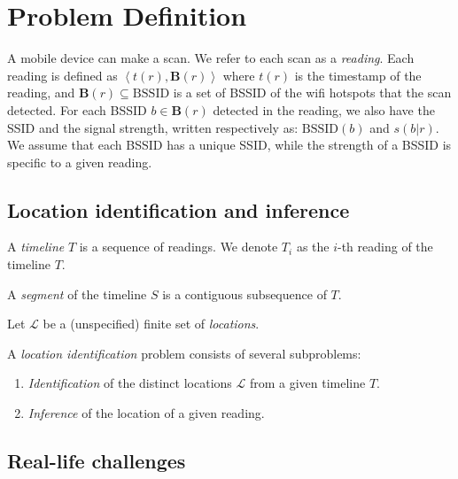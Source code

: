 \newcommand{\bssid}{\mathbf{B}}
\newcommand{\ssid}{\mathrm{BSSID}}
\renewcommand{\SS}{\mathbf{S}}
\newcommand{\FF}{\mathbf{F}}

\section{Problem Definition}

\label{sec:problem-def}

A mobile device can make a scan.  We refer to each scan as a {\em reading}.
Each reading is defined as $\left<t(r), \bssid(r)\right>$ where $t(r)$ is
the timestamp of the reading, and $\bssid(r)\subseteq\mathrm{BSSID}$ is a set of
BSSID of the wifi hotspots that the scan detected. For each BSSID $b\in
\bssid(r)$ detected in the reading, we also have the SSID and the signal
strength, written respectively as:
$\ssid(b)$ and $s(b|r)$.  We assume that each BSSID has a unique SSID, while the
strength of a BSSID is specific to a given reading.

\subsection{Location identification and inference}

\begin{definition}
    A {\em timeline} $T$ is a sequence of readings.  
    We denote $T_i$ as the $i$-th reading of the timeline $T$.

    A {\em segment} of the timeline $S$ is a contiguous subsequence of $T$.
\end{definition}

Let $\mathcal{L}$ be a (unspecified) finite set of {\em locations}.

\begin{definition}
    A {\em location identification} problem consists of several subproblems:

    \begin{enumerate}
        \item {\em Identification} of the distinct locations $\mathcal{L}$ from
            a given timeline $T$.
        \item {\em Inference} of the location of a given reading.
    \end{enumerate}
\end{definition}

\subsection{Real-life challenges}

